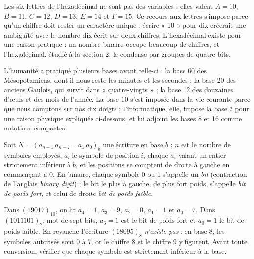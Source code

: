 Les six lettres de l'hexadécimal ne sont pas des variables : elles valent $A=10$, $B=11$, $C=12$, $D=13$, $E=14$ et $F=15$. Ce recours aux lettres s'impose parce qu'un chiffre doit rester un caractère unique : écrire « 10 » pour dix créerait une ambiguïté avec le nombre dix écrit sur deux chiffres. L'hexadécimal existe pour une raison pratique : un nombre binaire occupe beaucoup de chiffres, et l'hexadécimal, étudié à la section 2, le condense par groupes de quatre bits.

L'humanité a pratiqué plusieurs bases avant celle-ci : la base 60 des Mésopotamiens, dont il nous reste les minutes et les secondes ; la base 20 des anciens Gaulois, qui survit dans « quatre-vingts » ; la base 12 des douzaines d'œufs et des mois de l'année. La base 10 s'est imposée dans la vie courante parce que nous comptons sur nos dix doigts ; l'informatique, elle, impose la base 2 pour une raison physique expliquée ci-dessous, et lui adjoint les bases 8 et 16 comme notations compactes.

\begin{definition}
Soit $N = (a_{n-1}\,a_{n-2}\,\dots\,a_1\,a_0)_b$ une écriture en base $b$ : $n$ est le nombre de symboles employés, $a_i$ le symbole de position $i$, chaque $a_i$ valant un entier strictement inférieur à $b$, et les positions se comptent de droite à gauche en commençant à 0. En binaire, chaque symbole 0 ou 1 s'appelle un \emph{bit} (contraction de l'anglais \emph{binary digit}) ; le bit le plus à gauche, de plus fort poids, s'appelle \emph{bit de poids fort}, et celui de droite \emph{bit de poids faible}.
\end{definition}

\begin{exemple}
Dans $(19017)_{10}$, on lit $a_4=1$, $a_3=9$, $a_2=0$, $a_1=1$ et $a_0=7$. Dans $(1011101)_2$, mot de sept bits, $a_6=1$ est le bit de poids fort et $a_0=1$ le bit de poids faible. En revanche l'écriture $(18095)_8$ \emph{n'existe pas} : en base 8, les symboles autorisés sont 0 à 7, or le chiffre 8 et le chiffre 9 y figurent. Avant toute conversion, vérifier que chaque symbole est strictement inférieur à la base.
\end{exemple}

\begin{center}
\label{ch3:fig:poidsfort}
\end{center}


